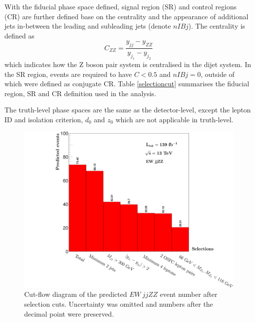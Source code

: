 \documentclass[12pt]{article}
\begin{document}
        \par With the fiducial phase space defined, signal region (SR) and control regions (CR) are further defined base on the centrality 
        and the appearance of additional jets in-between the leading and subleading jets (denote $nIBj$). 
        The centrality is defined as $$C_{ZZ} = \frac{y_{jj} - y_{ZZ}}{y_{j_1}-{y_{j_2}}}$$ which indicates how the Z boson pair system 
        is centralised in the dijet system. In the SR region, events are required to have $C < 0.5$ and $nIBj=0$, outside of which were 
        defined as conjugate CR. Table \ref{selectioncut} summarises the fiducial region, SR and CR definition used in the analysis.
        \par The truth-level phase spaces are the same as the detector-level, except the lepton ID and isolation 
        criterion, $d_0$ and $z_0$ which are not applicable in truth-level.
        \begin{figure}[ht]
            \begin{centering}
            \includegraphics[scale=0.14]{ps/cutflow_stack.png}
            \caption{Cut-flow diagram of the predicted $EW\ jjZZ$ event number after selection cuts. Uncertainty was omitted and numbers after the decimal point were preserved.}
            \label{fig:cutflow}
            \end{centering}
        \end{figure}
        
\end{document}
